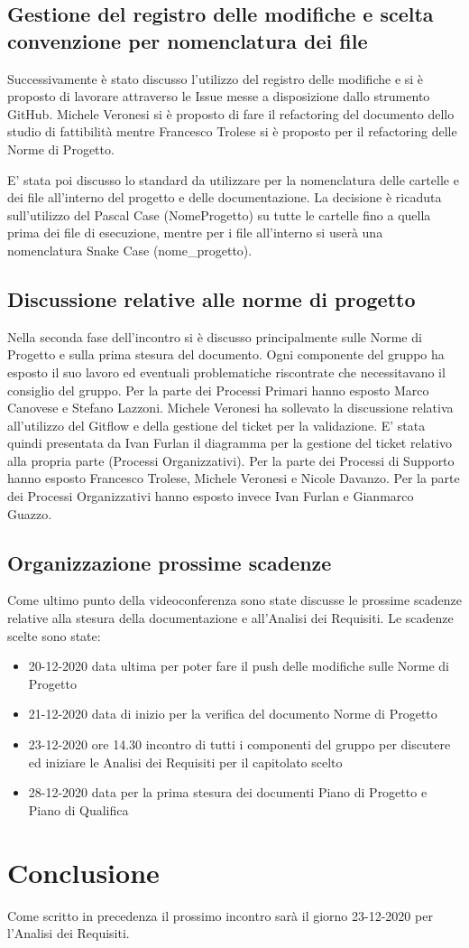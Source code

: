 \subsection{Gestione del registro delle modifiche e scelta convenzione per nomenclatura dei file}
Successivamente è stato discusso l'utilizzo del registro delle modifiche e si è proposto di lavorare attraverso le Issue messe a disposizione dallo strumento GitHub. Michele Veronesi si è proposto di fare il refactoring del documento  dello studio di fattibilità mentre Francesco Trolese si è proposto per il refactoring delle Norme di Progetto. 

E' stata poi discusso lo standard da utilizzare per la nomenclatura delle cartelle e dei file all'interno del progetto e delle documentazione. La decisione è ricaduta sull'utilizzo del Pascal Case (NomeProgetto) su tutte le cartelle fino a quella prima dei file di esecuzione, mentre per i file all'interno si userà una nomenclatura Snake Case (nome\_progetto).

\subsection{Discussione relative alle norme di progetto}
Nella seconda fase dell'incontro si è discusso principalmente sulle Norme di Progetto e sulla prima stesura del documento. Ogni componente del gruppo ha esposto il suo lavoro ed eventuali problematiche riscontrate che necessitavano il consiglio del gruppo. Per la parte dei Processi Primari hanno esposto Marco Canovese e Stefano Lazzoni. Michele Veronesi ha sollevato la discussione relativa all'utilizzo del Gitflow e della gestione del ticket per la validazione. E' stata quindi presentata da Ivan Furlan il diagramma per la gestione del ticket relativo alla propria parte (Processi Organizzativi). Per la parte dei Processi di Supporto hanno esposto Francesco Trolese, Michele Veronesi e Nicole Davanzo. Per la parte dei Processi Organizzativi hanno esposto invece Ivan Furlan e Gianmarco Guazzo.

\subsection{Organizzazione prossime scadenze}
Come ultimo punto della videoconferenza sono state discusse le prossime scadenze relative alla stesura della documentazione e all'Analisi dei Requisiti. Le scadenze scelte sono state:
\begin{itemize}
	\item 20-12-2020 data ultima per poter fare il push delle modifiche sulle Norme di Progetto
	\item 21-12-2020 data di inizio per la verifica del documento Norme di Progetto 
	\item 23-12-2020 ore 14.30 incontro di tutti i componenti del gruppo per discutere ed iniziare le Analisi dei Requisiti per il capitolato scelto
	\item 28-12-2020 data per la prima stesura dei documenti Piano di Progetto e Piano di Qualifica
\end{itemize}

\section{Conclusione}
Come scritto in precedenza il prossimo incontro sarà il giorno 23-12-2020 per l'Analisi dei Requisiti.

